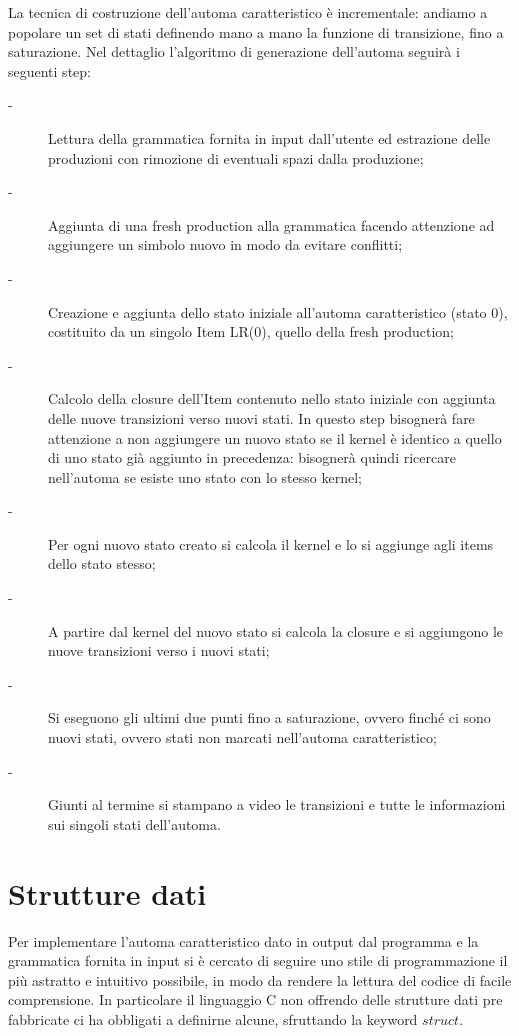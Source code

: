 \documentclass[12pt]{article}
\begin{document}
La tecnica di costruzione dell'automa caratteristico è incrementale: andiamo a popolare un set di stati definendo mano a mano la funzione di transizione, fino a saturazione. Nel dettaglio l'algoritmo di generazione dell'automa seguirà i seguenti step:
\begin{description}
\item[-] Lettura della grammatica fornita in input dall'utente ed estrazione delle produzioni con rimozione di eventuali spazi dalla produzione;
\item[-] Aggiunta di una fresh production alla grammatica facendo attenzione ad aggiungere un simbolo nuovo in modo da evitare conflitti;
\item[-] Creazione e aggiunta dello stato iniziale all'automa caratteristico (stato 0), costituito da un singolo Item LR(0), quello della fresh production;
\item[-] Calcolo della closure dell'Item contenuto nello stato iniziale con aggiunta delle nuove transizioni verso nuovi stati. In questo step bisognerà fare attenzione a non aggiungere un nuovo stato se il kernel è identico a quello di uno stato già aggiunto in precedenza: bisognerà quindi ricercare nell'automa se esiste uno stato con lo stesso kernel;
\item[-] Per ogni nuovo stato creato si calcola il kernel e lo si aggiunge agli items dello stato stesso;
\item[-] A partire dal kernel del nuovo stato si calcola la closure e si aggiungono le nuove transizioni verso i nuovi stati;
\item[-] Si eseguono gli ultimi due punti fino a saturazione, ovvero finché ci sono nuovi stati, ovvero stati non marcati nell'automa caratteristico;
\item[-] Giunti al termine si stampano a video le transizioni e tutte le informazioni sui singoli stati dell'automa.
\end{description}


\section{Strutture dati}
Per implementare l'automa caratteristico dato in output dal programma e la grammatica fornita in input si è cercato di seguire uno stile di programmazione il più astratto e intuitivo possibile, in modo da rendere la lettura del codice di facile comprensione. In particolare il linguaggio C non offrendo delle strutture dati pre fabbricate ci ha obbligati a definirne alcune, sfruttando la keyword $struct$.\\
\end{document}
